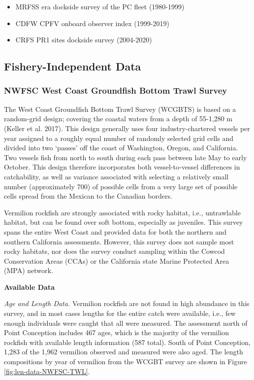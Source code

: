 \documentclass[
  english,
  a4paper,
]{article}
\providecommand{\tightlist}{%
  \setlength{\itemsep}{0pt}\setlength{\parskip}{0pt}}
\begin{document}
\begin{itemize}
\tightlist
\item
  MRFSS era dockside survey of the PC fleet (1980-1999)
\item
  CDFW CPFV onboard observer index (1999-2019)
\item
  CRFS PR1 sites dockside survey (2004-2020)
\end{itemize}

\hypertarget{fishery-independent-data}{%
\subsection{Fishery-Independent Data}\label{fishery-independent-data}}

\hypertarget{nwfsc-west-coast-groundfish-bottom-trawl-survey}{%
\subsubsection{NWFSC West Coast Groundfish Bottom Trawl Survey}\label{nwfsc-west-coast-groundfish-bottom-trawl-survey}}

The West Coast Groundfish Bottom Trawl Survey (WCGBTS) is based on a random-grid design;
covering the coastal waters from a depth of 55-1,280 m (Keller et al. 2017).
This design generally uses four industry-chartered vessels per year assigned to
a roughly equal number of randomly selected grid cells and divided into two `passes'
off the coast of Washington, Oregon, and California. Two vessels fish from north to
south during each pass between late
May to early October. This design therefore incorporates both vessel-to-vessel
differences in catchability, as well as variance associated with selecting a
relatively small number (approximately 700) of possible cells from a very large
set of possible cells spread from the Mexican to the Canadian borders.

Vermilion rockfish are strongly associated with rocky
habitat, i.e., untrawlable habitat, but can be found over soft bottom, especially as
juveniles. This survey spans the entire West Coast and provided data for both the
northern and southern California assessments. However, this survey does not sample
most rocky habitats, nor does the survey conduct sampling within the Cowcod
Conservation Areas (CCAs) or the California state Marine Protected Area (MPA) network.

\textbf{Available Data}

\emph{Age and Length Data.} Vermilion rockfish are not found in high abundance in
this survey, and in most cases lengths for the entire catch were available,
i.e., few enough individuals were caught that
all were measured. The assessment north of Point Conception includes 467 ages, which
is the majority of the vermilion rockfish with available length information (587 total).
South of Point Conception, 1,283 of the 1,962 vermilion observed and measured
were also aged. The length compositions by year of vermilion from the WCGBT
survey are shown in Figure \ref{fig:len-data-NWFSC-TWL}.
\end{document}
